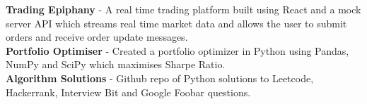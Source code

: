 
\begin{cvparagraph}

\textbf{Trading Epiphany}
- A real time trading platform built using React and a mock server API
which streams real time market data and allows the user to submit orders and
receive order update messages.\\
\textbf{Portfolio Optimiser}
- Created a portfolio optimizer in Python using Pandas, NumPy and SciPy which maximises Sharpe Ratio.\\
\textbf{Algorithm Solutions}
- Github repo of Python solutions to Leetcode, Hackerrank, Interview Bit and Google Foobar questions.
\end{cvparagraph}
